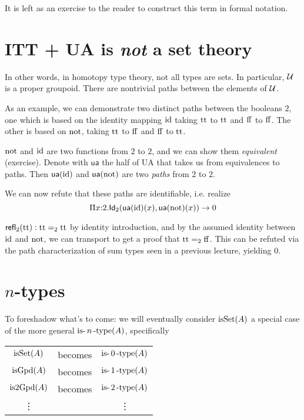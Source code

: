 \documentclass[11pt]{article}
\begin{document}
It is left as an exercise to the reader to construct this term in formal
notation.


\section{ITT + UA is {\em not} a set theory}

In other words, in homotopy type theory, not all types are sets. In
particular, $\mathcal{U}$ is a proper groupoid. There are nontrivial paths
between the elements of $\mathcal{U}$.

As an example, we can demonstrate two distinct paths between the booleans
$2$, one which is based on the identity mapping $\operatorname{id}$ taking $\operatorname{tt}$
to $\operatorname{tt}$ and $\operatorname{ff}$ to $\operatorname{ff}$. The other is based on $\operatorname{not}$,
taking $\operatorname{tt}$ to $\operatorname{ff}$ and $\operatorname{ff}$ to $\operatorname{tt}$.

$\operatorname{not}$ and $\operatorname{id}$ are two functions from ${2}$ to ${2}$, and we can
show them {\em equivalent} (exercise). Denote with $\mathsf{ua}$ the 
half of UA that takes us from equivalences to paths. Then
$\mathsf{ua}(\operatorname{id})$ and
$\mathsf{ua}(\operatorname{not})$ are two {\em paths} from $2$ to $2$. 

We can now refute that these paths are identifiable, i.e. realize
\[
\Pi x{:}2.\mathsf{Id}_{2}(\mathsf{ua}(\operatorname{id})(x),\mathsf{ua}(\operatorname{not})(x)) \to 0
\]

$\mathsf{refl}_2(\operatorname{tt}) : \operatorname{tt} =_2 \operatorname{tt}$ by identity introduction,
and by the assumed identity between $\operatorname{id}$ and $\operatorname{not}$, we can
transport to get a proof that $\operatorname{tt} =_2 \operatorname{ff}$. This can be refuted
via the path characterization of sum types seen in a previous lecture,
yielding $0$.

\section{$n$-types}

To foreshadow what's to come: we will eventually consider $\operatorname{isSet}(A)$ a
special case of the more general $\operatorname{is-}n\operatorname{-type}(A)$, specifically

\newcommand{\isntype}[1]{\op{is-}{#1}\op{-type}}

\begin{tabular}{ccc}
$\operatorname{isSet}(A)$ & becomes & $\isntype{0}(A)$ \\
$\operatorname{isGpd}(A)$ & becomes & $\isntype{1}(A)$ \\
$\operatorname{is2Gpd}(A)$ & becomes & $\isntype{2}(A)$ \\
\vdots & & \vdots
\end{tabular}
\bigskip
\end{document}

